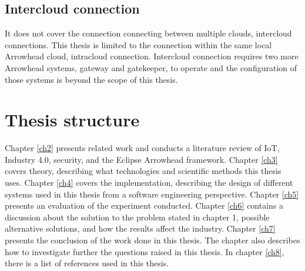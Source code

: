 \subsection{Intercloud connection}
It does not cover the connection connecting between multiple clouds, intercloud connections. 
This thesis is limited to the connection within the same local Arrowhead cloud, intracloud connection.  
Intercloud connection requires two more Arrowhead systems, gateway and gatekeeper, to operate and the configuration of those systems is beyond the scope of this thesis.

\section{Thesis structure}
Chapter \ref{ch2} presents related work and conducts a literature review of IoT, Industry 4.0, security, and the Eclipse Arrowhead framework.
Chapter \ref{ch3} covers theory, describing what technologies and scientific methods this thesis uses.
Chapter \ref{ch4} covers the implementation, describing the design of different systems used in this thesis from a software engineering perspective.
Chapter \ref{ch5} presents an evaluation of the experiment conducted.
Chapter \ref{ch6} contains a discussion about the solution to the problem stated in chapter 1, possible alternative solutions, and how the results affect the industry.
Chapter \ref{ch7} presents the conclusion of the work done in this thesis. The chapter also describes how to investigate further the questions raised in this thesis. 
In chapter \ref{ch8}, there is a list of references used in this thesis.
